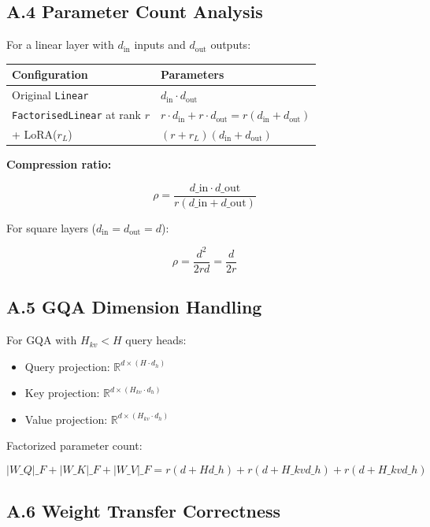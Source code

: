 \subsection{A.4 Parameter Count Analysis}

For a linear layer with $d_\text{in}$ inputs and $d_\text{out}$ outputs:

\begin{table}[H]
\centering
\small
\begin{tabular}{ll}
\toprule
\textbf{Configuration} & \textbf{Parameters} \\
\midrule
Original \texttt{Linear} & $d_\text{in} \cdot d_\text{out}$ \\
\texttt{FactorisedLinear} at rank $r$ & $r \cdot d_\text{in} + r \cdot d_\text{out} = r(d_\text{in} + d_\text{out})$ \\
+ LoRA($r_L$) & $(r + r_L)(d_\text{in} + d_\text{out})$ \\
\bottomrule
\end{tabular}
\end{table}

\textbf{Compression ratio:}

\[
\rho = \frac{d\_\text{in} \cdot d\_\text{out}}{r(d\_\text{in} + d\_\text{out})}
\tag{A.5}
\]

For square layers ($d_\text{in} = d_\text{out} = d$):

\[
\rho = \frac{d^2}{2rd} = \frac{d}{2r}
\tag{A.6}
\]

\subsection{A.5 GQA Dimension Handling}

For GQA with $H_{kv} < H$ query heads:

\begin{itemize}
\item Query projection: $\mathbb{R}^{d \times (H \cdot d_h)}$
\item Key projection: $\mathbb{R}^{d \times (H_{kv} \cdot d_h)}$
\item Value projection: $\mathbb{R}^{d \times (H_{kv} \cdot d_h)}$

\end{itemize}
Factorized parameter count:

\[
|W\_Q|\_F + |W\_K|\_F + |W\_V|\_F = r(d + H d\_h) + r(d + H\_{kv} d\_h) + r(d + H\_{kv} d\_h)
\tag{A.7}
\]

\subsection{A.6 Weight Transfer Correctness}

